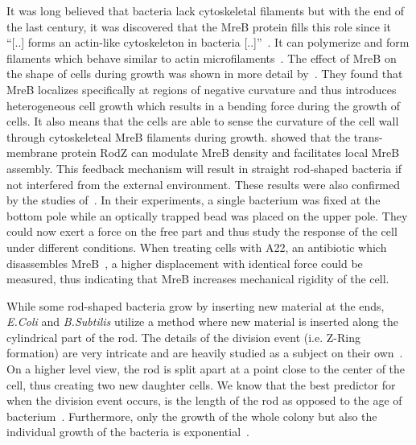 \documentclass{article}
\begin{document}
It was long believed that bacteria lack cytoskeletal filaments but with the end of the last century,
it was discovered that the MreB protein fills this role since it “[..] forms an actin-like
cytoskeleton in bacteria [..]”~\cite{Erickson2001}.
It can polymerize and form filaments which behave similar to actin microfilaments~\cite{Dersch2020}.
The effect of MreB on the shape of cells during growth was shown in more detail
by~\cite{Ursell2014}.
They found that MreB localizes specifically at regions of negative curvature and thus introduces
heterogeneous cell growth which results in a bending force during the growth of cells.
It also means that the cells are able to sense the curvature of the cell wall through cytoskeleteal
MreB filaments during growth.
\cite{Bratton2018} showed that the trans-membrane protein RodZ can modulate MreB density and
facilitates local MreB assembly.
This feedback mechanism will result in straight rod-shaped bacteria if not interfered from the
external environment.
These results were also confirmed by the studies of~\cite{Wang2010}.
In their experiments, a single bacterium was fixed at the bottom pole while an optically trapped
bead was placed on the upper pole.
They could now exert a force on the free part and thus study the response of the cell under
different conditions.
When treating cells with A22, an antibiotic which disassembles
MreB~\cite{IWAI2002,Gitai2005,Karczmarek2007,Bean2009}, a higher displacement with identical force
could be measured, thus indicating that MreB increases mechanical rigidity of the cell.

While some rod-shaped bacteria grow by inserting new material at the ends, \textit{E.Coli} and
\textit{B.Subtilis} utilize a method where new material is inserted along the cylindrical part of
the rod.
The details of the division event (i.e. Z-Ring formation) are very intricate and are heavily
studied as a subject on their own~\cite{Harry2001}.
On a higher level view, the rod is split apart at a point close to the center of the cell, thus
creating two new daughter cells.
We know that the best predictor for when the division event occurs, is the length of the rod as
opposed to the age of bacterium~\cite{Robert2014}.
Furthermore, only the growth of the whole colony but also the individual growth of the bacteria is
exponential~\cite{Amir2014,Takeuchi2005}.
\end{document}
